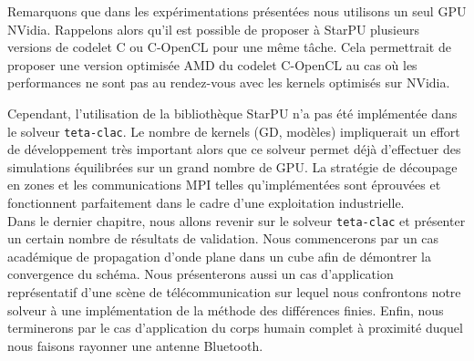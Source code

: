 Remarquons que dans les expérimentations présentées
nous utilisons un seul GPU NVidia.
Rappelons alors qu'il est possible de proposer à StarPU plusieurs versions
de codelet C ou C-OpenCL pour une même tâche.
Cela permettrait de proposer une version optimisée AMD du codelet
C-OpenCL au cas où les performances ne sont pas au rendez-vous
avec les kernels optimisés sur NVidia.

Cependant, l'utilisation de la bibliothèque StarPU n'a pas été
implémentée dans le solveur \texttt{teta-clac}. Le nombre
de kernels (GD, modèles) impliquerait un effort de développement
très important alors que ce solveur permet déjà d'effectuer
des simulations équilibrées sur un grand nombre de GPU.
La stratégie de découpage en zones et les communications MPI
telles qu'implémentées sont éprouvées et fonctionnent parfaitement
dans le cadre d'une exploitation industrielle.
\\

Dans le dernier chapitre, nous allons revenir sur le solveur
\texttt{teta-clac} et présenter un certain nombre de résultats
de validation.
Nous commencerons par un cas académique de propagation d'onde
plane dans un cube afin de démontrer la convergence du schéma.
Nous présenterons aussi un cas d'application représentatif
d'une scène de télécommunication sur lequel nous confrontons
notre solveur à une implémentation de la méthode des
différences finies.
Enfin, nous terminerons par le cas d'application du corps
humain complet à proximité duquel nous faisons rayonner
une antenne Bluetooth.
